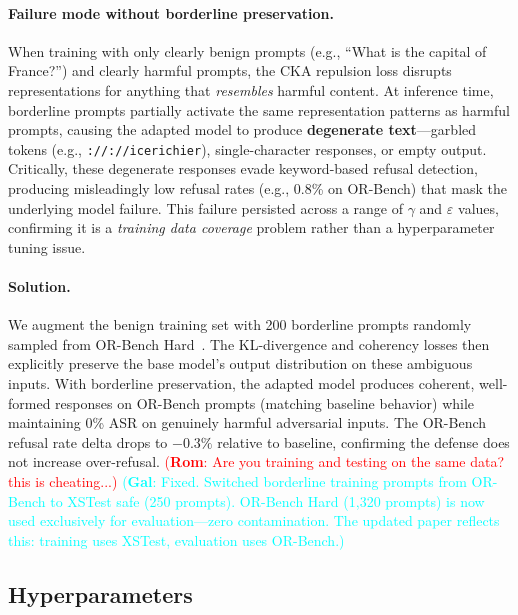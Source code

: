 \documentclass[11pt]{article}
\newcommand\rom[1]{\textcolor{red}{(\textbf{Rom}: #1)}} %
\newcommand\gal[1]{\textcolor{cyan}{(\textbf{Gal}: #1)}} %
\begin{document}
\paragraph{Failure mode without borderline preservation.}
When training with only clearly benign prompts (e.g., ``What is the capital of France?'') and clearly harmful prompts, the CKA repulsion loss disrupts representations for anything that \emph{resembles} harmful content. At inference time, borderline prompts partially activate the same representation patterns as harmful prompts, causing the adapted model to produce \textbf{degenerate text}---garbled tokens (e.g., \texttt{://://icerichier}), single-character responses, or empty output. Critically, these degenerate responses evade keyword-based refusal detection, producing misleadingly low refusal rates (e.g., 0.8\% on OR-Bench) that mask the underlying model failure. This failure persisted across a range of $\gamma$ and $\varepsilon$ values, confirming it is a \emph{training data coverage} problem rather than a hyperparameter tuning issue.

\paragraph{Solution.}
We augment the benign training set with 200 borderline prompts randomly sampled from OR-Bench Hard~\cite{orbench}. The KL-divergence and coherency losses then explicitly preserve the base model's output distribution on these ambiguous inputs. With borderline preservation, the adapted model produces coherent, well-formed responses on OR-Bench prompts (matching baseline behavior) while maintaining 0\% ASR on genuinely harmful adversarial inputs. The OR-Bench refusal rate delta drops to $-0.3\%$ relative to baseline, confirming the defense does not increase over-refusal. \rom{Are you training and testing on the same data? this is cheating...} \gal{Fixed. Switched borderline training prompts from OR-Bench to XSTest safe (250 prompts). OR-Bench Hard (1,320 prompts) is now used exclusively for evaluation---zero contamination. The updated paper reflects this: training uses XSTest, evaluation uses OR-Bench.}

\subsection{Hyperparameters}
\end{document}
